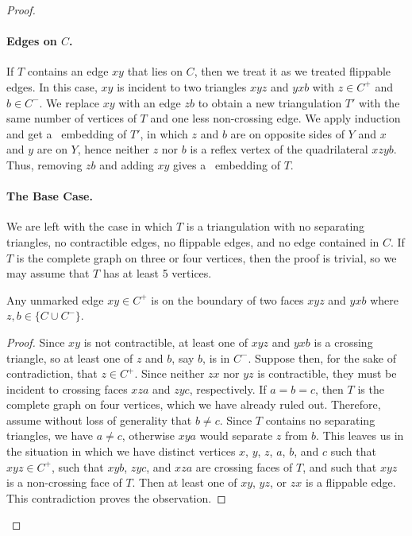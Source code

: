 \begin{proof}
	\paragraph{Edges on $C$.}
	
	If $T$ contains an edge $xy$ that lies on $C$, then we treat it as we treated flippable edges. In this case, $xy$ is incident to two triangles $xyz$ and $yxb$ with $z\in C^+$ and $b\in C^-$. We replace $xy$ with an edge $zb$ to obtain a new triangulation $T'$ with the same number of vertices of $T$ and one less non-crossing edge. We apply induction and get a \Fary\ embedding of $T'$, in which $z$ and $b$ are
	on opposite sides of $Y$ and $x$ and $y$ are on $Y$, hence 	neither $z$ nor $b$ is a reflex vertex of the quadrilateral $xzyb$.
	Thus, removing $zb$ and adding $xy$ gives a \Fary\ embedding of $T$.
	
	\paragraph{The Base Case.}
	
	We are left with the case in which $T$ is a triangulation
	with no separating triangles, no contractible edges, no flippable
	edges, and no edge contained in $C$.  If $T$ is the complete graph
	on three or four vertices, then the proof is trivial,
	so we may assume that $T$ has at least 5 vertices.
	
	\begin{claimx} 
	Any unmarked edge $xy \in C^+$ is on the boundary of two faces $xyz$ and $yxb$ where $z,b\in\{C \cup C^-\}$.
	\end{claimx}
		
	\begin{proof}
	Since $xy$ is not contractible, at least one of $xyz$ and $yxb$ is a
	crossing triangle, so at least one of $z$ and $b$, say $b$, is in $C^-$.
	Suppose then, for the sake of contradiction, that $z\in C^+$. Since neither $zx$ nor $yz$ is contractible,
	they must be incident to crossing faces $xza$ and $zyc$, respectively.
	If $a=b=c$, then $T$ is the complete graph on four vertices,
	which we have already ruled out.  Therefore, assume without loss of
	generality that $b\neq c$.  Since $T$ contains no separating triangles,
	we have $a\neq c$, otherwise $xya$ would separate $z$ from $b$.	
	This leaves us in the situation in which we have distinct vertices $x$,
	$y$, $z$, $a$, $b$, and $c$ such that $xyz\in C^+$, such that $xyb$, $zyc$, and $xza$
	are crossing faces of $T$, and such that $xyz$ is a non-crossing face of $T$.
	Then at least one of $xy$, $yz$, or $zx$ is a flippable edge. This contradiction proves the observation.
\end{proof}	


\end{proof}
